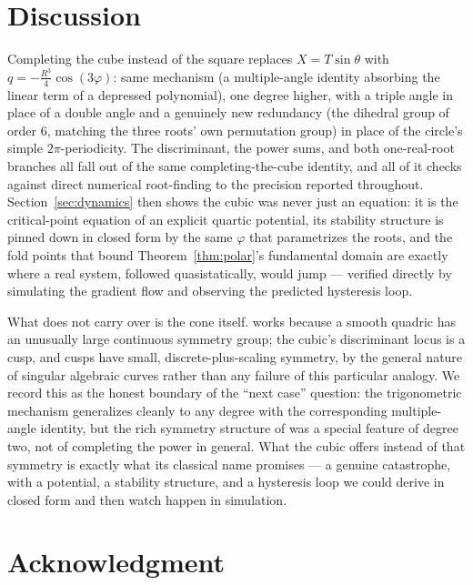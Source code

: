\documentclass[11pt]{amsart}
\theoremstyle{remark}
\begin{document}
\section{Discussion}

Completing the cube instead of the square replaces $X=T\sin\theta$ with $q=-\tfrac{R^3}4\cos(3\varphi)$: same mechanism (a multiple-angle identity absorbing the linear term of a depressed polynomial), one degree higher, with a triple angle in place of a double angle and a genuinely new redundancy (the dihedral group of order $6$, matching the three roots' own permutation group) in place of the circle's simple $2\pi$-periodicity. The discriminant, the power sums, and both one-real-root branches all fall out of the same completing-the-cube identity, and all of it checks against direct numerical root-finding to the precision reported throughout. Section~\ref{sec:dynamics} then shows the cubic was never just an equation: it is the critical-point equation of an explicit quartic potential, its stability structure is pinned down in closed form by the same $\varphi$ that parametrizes the roots, and the fold points that bound Theorem~\ref{thm:polar}'s fundamental domain are exactly where a real system, followed quasistatically, would jump --- verified directly by simulating the gradient flow and observing the predicted hysteresis loop.

What does not carry over is the cone itself. \cite{Ebert2026EigenCoord} works because a smooth quadric has an unusually large continuous symmetry group; the cubic's discriminant locus is a cusp, and cusps have small, discrete-plus-scaling symmetry, by the general nature of singular algebraic curves rather than any failure of this particular analogy. We record this as the honest boundary of the ``next case'' question: the trigonometric mechanism generalizes cleanly to any degree with the corresponding multiple-angle identity, but the rich symmetry structure of \cite{Ebert2026Table,Ebert2026EigenCoord} was a special feature of degree two, not of completing the power in general. What the cubic offers instead of that symmetry is exactly what its classical name promises --- a genuine catastrophe, with a potential, a stability structure, and a hysteresis loop we could derive in closed form and then watch happen in simulation.

\section*{Acknowledgment}
\end{document}
